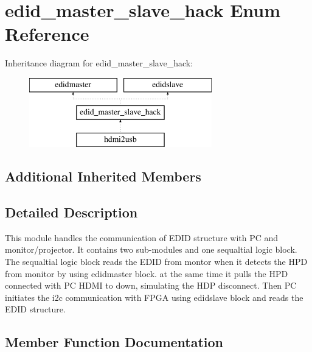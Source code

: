 \section{edid\-\_\-master\-\_\-slave\-\_\-hack Enum Reference}
\label{enum1edid__master__slave__hack}
Inheritance diagram for edid\-\_\-master\-\_\-slave\-\_\-hack\-:\begin{figure}[H]
\begin{center}
\leavevmode
\includegraphics[height=3.000000cm]{enum1edid__master__slave__hack}
\end{center}
\end{figure}
\subsection*{Additional Inherited Members}


\subsection{Detailed Description}
This module handles the communication of E\-D\-I\-D structure with P\-C and monitor/projector. It contains two sub-\/modules and one sequaltial logic block. The sequaltial logic block reads the E\-D\-I\-D from montor when it detects the H\-P\-D from monitor by using edidmaster block. at the same time it pulls the H\-P\-D connected with P\-C H\-D\-M\-I to down, simulating the H\-D\-P disconnect. Then P\-C initiates the i2c communication with F\-P\-G\-A using edidslave block and reads the E\-D\-I\-D structure. 

\subsection{Member Function Documentation}
\subsubsection[{P\-R\-O\-C\-E\-S\-S\-\_\-13}]{\setlength{\rightskip}{0pt plus 5cm}\hspace{0.3cm}}\label{enum1edid__master__slave__hack_ab420c8ab236dc4c973f8a5ae6dccbd65}


